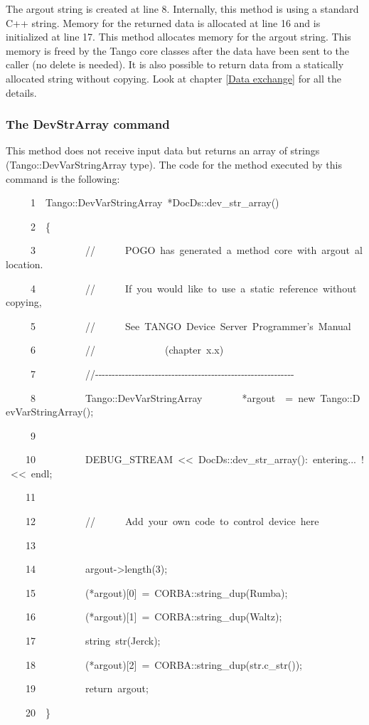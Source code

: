 The argout string is created at line 8. Internally, this method is
using a standard C++ string. Memory for the returned data is allocated
at line 16 and is initialized at line 17. This method allocates memory
for the argout string. This memory is freed by the Tango core classes
after the data have been sent to the caller (no delete is needed).
It is also possible to return data from a statically allocated string
without copying. Look at chapter \ref{Data exchange} for all the
details.


\subsubsection{The DevStrArray command}

This method does not receive input data but returns an array of strings
(Tango::DevVarStringArray type).
The code for the method executed by this command is the following:


\begin{lyxcode}
~~~~~1~~Tango::DevVarStringArray~{*}DocDs::dev\_str\_array()

~~~~~2~~\{

~~~~~3~~~~~~~~~~//~~~~~~POGO~has~generated~a~method~core~with~argout~allocation.

~~~~~4~~~~~~~~~~//~~~~~~If~you~would~like~to~use~a~static~reference~without~copying,

~~~~~5~~~~~~~~~~//~~~~~~See~\textquotedbl{}TANGO~Device~Server~Programmer's~Manual\textquotedbl{}

~~~~~6~~~~~~~~~~//~~~~~~~~~~~~~~(chapter~x.x)

~~~~~7~~~~~~~~~~//-{}-{}-{}-{}-{}-{}-{}-{}-{}-{}-{}-{}-{}-{}-{}-{}-{}-{}-{}-{}-{}-{}-{}-{}-{}-{}-{}-{}-{}-{}-{}-{}-{}-{}-{}-{}-{}-{}-{}-{}-{}-{}-{}-{}-{}-{}-{}-{}-{}-{}-{}-{}-{}-{}-{}-{}-{}-{}-{}-

~~~~~8~~~~~~~~~~Tango::DevVarStringArray~~~~~~~~{*}argout~~=~new~Tango::DevVarStringArray();

~~~~~9~~

~~~~10~~~~~~~~~~DEBUG\_STREAM~<\textcompwordmark{}<~\textquotedbl{}DocDs::dev\_str\_array():~entering...~!\textquotedbl{}~<\textcompwordmark{}<~endl;

~~~~11~~

~~~~12~~~~~~~~~~//~~~~~~Add~your~own~code~to~control~device~here

~~~~13~~

~~~~14~~~~~~~~~~argout->length(3);

~~~~15~~~~~~~~~~({*}argout){[}0{]}~=~CORBA::string\_dup(\textquotedbl{}Rumba\textquotedbl{});

~~~~16~~~~~~~~~~({*}argout){[}1{]}~=~CORBA::string\_dup(\textquotedbl{}Waltz\textquotedbl{});

~~~~17~~~~~~~~~~string~str(\textquotedbl{}Jerck\textquotedbl{});

~~~~18~~~~~~~~~~({*}argout){[}2{]}~=~CORBA::string\_dup(str.c\_str());

~~~~19~~~~~~~~~~return~argout;

~~~~20~~\}
\end{lyxcode}


